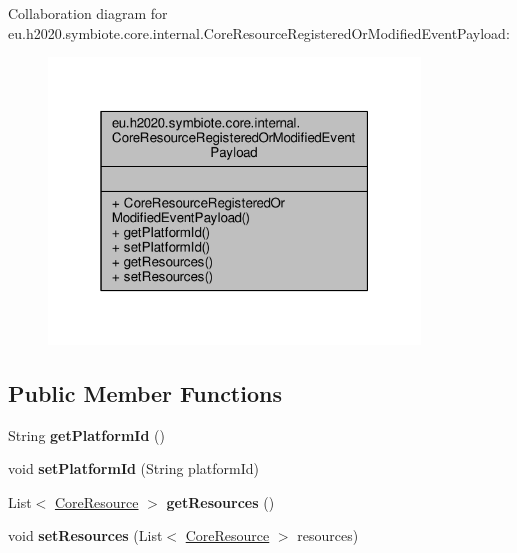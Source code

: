 Collaboration diagram for eu.\+h2020.\+symbiote.\+core.\+internal.\+Core\+Resource\+Registered\+Or\+Modified\+Event\+Payload\+:
\nopagebreak
\begin{figure}[H]
\begin{center}
\leavevmode
\includegraphics[width=280pt]{classeu_1_1h2020_1_1symbiote_1_1core_1_1internal_1_1CoreResourceRegisteredOrModifiedEventPayload__coll__graph}
\end{center}
\end{figure}
\subsection*{Public Member Functions}
\begin{DoxyCompactItemize}
\item 
\mbox{\label{classeu_1_1h2020_1_1symbiote_1_1core_1_1internal_1_1CoreResourceRegisteredOrModifiedEventPayload_ab4e4f2f9c2af9b767ec0a98dbee24788}} 
String {\bfseries get\+Platform\+Id} ()
\item 
\mbox{\label{classeu_1_1h2020_1_1symbiote_1_1core_1_1internal_1_1CoreResourceRegisteredOrModifiedEventPayload_a05af9348039ffae8f14c7b78e5ecc008}} 
void {\bfseries set\+Platform\+Id} (String platform\+Id)
\item 
\mbox{\label{classeu_1_1h2020_1_1symbiote_1_1core_1_1internal_1_1CoreResourceRegisteredOrModifiedEventPayload_a91a810ad8a7b89a7b6c849ac24d983da}} 
List$<$ \hyperlink{classeu_1_1h2020_1_1symbiote_1_1core_1_1internal_1_1CoreResource}{Core\+Resource} $>$ {\bfseries get\+Resources} ()
\item 
\mbox{\label{classeu_1_1h2020_1_1symbiote_1_1core_1_1internal_1_1CoreResourceRegisteredOrModifiedEventPayload_a13bd56894bf91b3767a6d5cfa25248c6}} 
void {\bfseries set\+Resources} (List$<$ \hyperlink{classeu_1_1h2020_1_1symbiote_1_1core_1_1internal_1_1CoreResource}{Core\+Resource} $>$ resources)
\end{DoxyCompactItemize}


